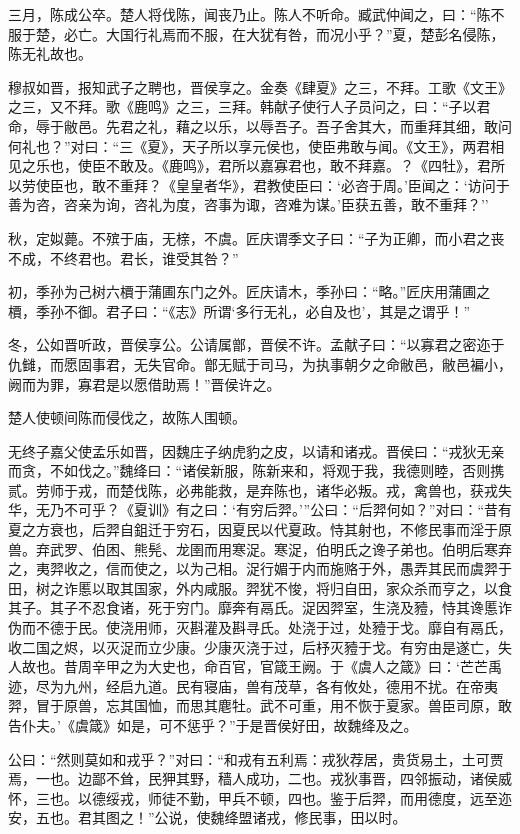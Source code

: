 \documentclass[]{article}
\begin{document}
三月，陈成公卒。楚人将伐陈，闻丧乃止。陈人不听命。臧武仲闻之，曰：``陈不服于楚，必亡。大国行礼焉而不服，在大犹有咎，而况小乎？''夏，楚彭名侵陈，陈无礼故也。

穆叔如晋，报知武子之聘也，晋侯享之。金奏《肆夏》之三，不拜。工歌《文王》之三，又不拜。歌《鹿鸣》之三，三拜。韩献子使行人子员问之，曰：``子以君命，辱于敝邑。先君之礼，藉之以乐，以辱吾子。吾子舍其大，而重拜其细，敢问何礼也？''对曰：``三《夏》，天子所以享元侯也，使臣弗敢与闻。《文王》，两君相见之乐也，使臣不敢及。《鹿鸣》，君所以嘉寡君也，敢不拜嘉。？《四牡》，君所以劳使臣也，敢不重拜？《皇皇者华》，君教使臣曰：`必咨于周。'臣闻之：`访问于善为咨，咨亲为询，咨礼为度，咨事为诹，咨难为谋。'臣获五善，敢不重拜？''

秋，定姒薨。不殡于庙，无榇，不虞。匠庆谓季文子曰：``子为正卿，而小君之丧不成，不终君也。君长，谁受其咎？''

初，季孙为己树六檟于蒲圃东门之外。匠庆请木，季孙曰：``略。''匠庆用蒲圃之檟，季孙不御。君子曰：``《志》所谓`多行无礼，必自及也'，其是之谓乎！''

冬，公如晋听政，晋侯享公。公请属鄫，晋侯不许。孟献子曰：``以寡君之密迩于仇雠，而愿固事君，无失官命。鄫无赋于司马，为执事朝夕之命敝邑，敝邑褊小，阙而为罪，寡君是以愿借助焉！''晋侯许之。

楚人使顿间陈而侵伐之，故陈人围顿。

无终子嘉父使孟乐如晋，因魏庄子纳虎豹之皮，以请和诸戎。晋侯曰：``戎狄无亲而贪，不如伐之。''魏绛曰：``诸侯新服，陈新来和，将观于我，我德则睦，否则携贰。劳师于戎，而楚伐陈，必弗能救，是弃陈也，诸华必叛。戎，禽兽也，获戎失华，无乃不可乎？《夏训》有之曰：`有穷后羿。'''公曰：``后羿何如？''对曰：``昔有夏之方衰也，后羿自鉏迁于穷石，因夏民以代夏政。恃其射也，不修民事而淫于原兽。弃武罗、伯困、熊髡、龙圉而用寒浞。寒浞，伯明氏之谗子弟也。伯明后寒弃之，夷羿收之，信而使之，以为己相。浞行媚于内而施赂于外，愚弄其民而虞羿于田，树之诈慝以取其国家，外内咸服。羿犹不悛，将归自田，家众杀而亨之，以食其子。其子不忍食诸，死于穷门。靡奔有鬲氏。浞因羿室，生浇及豷，恃其谗慝诈伪而不德于民。使浇用师，灭斟灌及斟寻氏。处浇于过，处豷于戈。靡自有鬲氏，收二国之烬，以灭浞而立少康。少康灭浇于过，后杼灭豷于戈。有穷由是遂亡，失人故也。昔周辛甲之为大史也，命百官，官箴王阙。于《虞人之箴》曰：`芒芒禹迹，尽为九州，经启九道。民有寝庙，兽有茂草，各有攸处，德用不扰。在帝夷羿，冒于原兽，忘其国恤，而思其麀牡。武不可重，用不恢于夏家。兽臣司原，敢告仆夫。'《虞箴》如是，可不惩乎？''于是晋侯好田，故魏绛及之。

公曰：``然则莫如和戎乎？''对曰：``和戎有五利焉：戎狄荐居，贵货易土，土可贾焉，一也。边鄙不耸，民狎其野，穑人成功，二也。戎狄事晋，四邻振动，诸侯威怀，三也。以德绥戎，师徒不勤，甲兵不顿，四也。鉴于后羿，而用德度，远至迩安，五也。君其图之！''公说，使魏绛盟诸戎，修民事，田以时。
\end{document}
